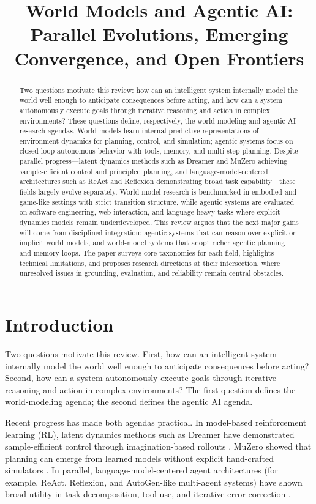 \documentclass[conference]{IEEEtran}
\title{World Models and Agentic AI: Parallel Evolutions, Emerging Convergence, and Open Frontiers}
\author{\IEEEauthorblockN{Banajyotshna Devi}\IEEEauthorblockA{Deep Learning -- Project 6\\Instructor: Lu Zhang\\April 2026}}
\begin{document}
\maketitle

\begin{abstract}
Two questions motivate this review: how can an intelligent system internally model the world well enough to anticipate consequences before acting, and how can a system autonomously execute goals through iterative reasoning and action in complex environments? These questions define, respectively, the world-modeling and agentic AI research agendas. World models learn internal predictive representations of environment dynamics for planning, control, and simulation; agentic systems focus on closed-loop autonomous behavior with tools, memory, and multi-step planning. Despite parallel progress---latent dynamics methods such as Dreamer and MuZero achieving sample-efficient control and principled planning, and language-model-centered architectures such as ReAct and Reflexion demonstrating broad task capability---these fields largely evolve separately. World-model research is benchmarked in embodied and game-like settings with strict transition structure, while agentic systems are evaluated on software engineering, web interaction, and language-heavy tasks where explicit dynamics models remain underdeveloped. This review argues that the next major gains will come from disciplined integration: agentic systems that can reason over explicit or implicit world models, and world-model systems that adopt richer agentic planning and memory loops. The paper surveys core taxonomies for each field, highlights technical limitations, and proposes research directions at their intersection, where unresolved issues in grounding, evaluation, and reliability remain central obstacles.
\end{abstract}

\section{Introduction}
Two questions motivate this review. First, how can an intelligent system internally model the world well enough to anticipate consequences before acting? Second, how can a system autonomously execute goals through iterative reasoning and action in complex environments? The first question defines the world-modeling agenda; the second defines the agentic AI agenda.

Recent progress has made both agendas practical. In model-based reinforcement learning (RL), latent dynamics methods such as Dreamer have demonstrated sample-efficient control through imagination-based rollouts \cite{hafner2020dream, hafner2021mastering, hafner2023mastering}. MuZero showed that planning can emerge from learned models without explicit hand-crafted simulators \cite{schrittwieser2020muzero}. In parallel, language-model-centered agent architectures (for example, ReAct, Reflexion, and AutoGen-like multi-agent systems) have shown broad utility in task decomposition, tool use, and iterative error correction \cite{yao2023react, shinn2023reflexion, wu2023autogen}.
\end{document}
